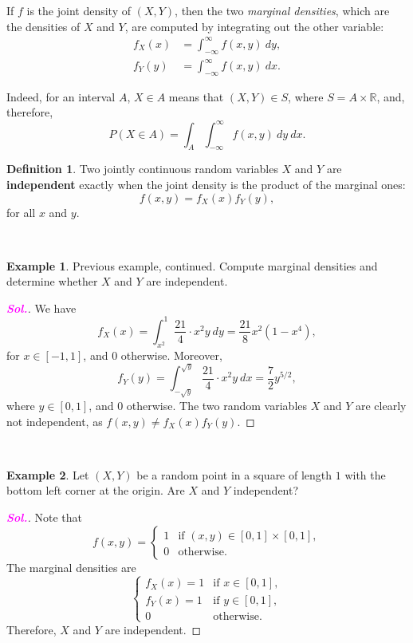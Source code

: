 \documentclass[12pt,a4paper]{article}
\theoremstyle{definition}
\newtheorem{example}{Example}[section]
\theoremstyle{definition}
\newtheorem*{definition}{Definition}
\theoremstyle{definition}
\theoremstyle{definition}
\theoremstyle{remark}
\theoremstyle{definition}
\newcommand{\sol}{\textcolor{magenta}{\bf \textit{Sol.}}\quad}
\begin{document}
\newpage
\begin{tcolorbox}[colback=white]
	If $f$ is the joint density of $(X,Y)$, then the two \textit{marginal densities}, which are the densities of $X$ and $Y$, are computed by integrating out the other variable: \begin{align*}
	f_X(x)&=\int_{-\infty}^\infty f(x,y)\ dy,\\
	f_Y(y)&=\int_{-\infty}^\infty f(x,y)\ dx.
	\end{align*}
\end{tcolorbox} Indeed, for an interval $A$, $X\in A$ means that $(X,Y)\in S$, where $S=A\times\mathbb{R}$, and, therefore, \[
P(X\in A)=\int_A\int_{-\infty}^\infty f(x,y)\ dy\ dx.
\]
\begin{tcolorbox}[colback=white]
	\begin{definition}	
	Two jointly continuous random variables $X$ and $Y$ are \textbf{independent} exactly when the joint density is the product of the marginal ones: \[
	f(x,y)=f_X(x)f_Y(y),
	\] for all $x$ and $y$.
	\end{definition}
\end{tcolorbox}
\
\begin{example}
	Previous example, continued. Compute marginal densities and determine whether $X$ and $Y$ are independent. \begin{proof}[\sol]
		We have \[
		f_X(x)=\int_{x^2}^1\frac{21}{4}\cdot x^2y\ dy=\frac{21}{8}x^2(1-x^4),
		\] for $x\in[-1,1]$, and $0$ otherwise. Moreover, \[
		f_Y(y)=\int_{-\sqrt{y}}^{\sqrt{y}}\frac{21}{4}\cdot x^2y\ dx=\frac{7}{2}y^{5/2},
		\] where $y\in[0,1]$, and $0$ otherwise. The two random variables $X$ and $Y$ are clearly not independent, as $f(x,y)\neq f_X(x)f_Y(y)$.
	\end{proof}
\end{example}
\
\begin{example}
	Let $(X,Y)$ be a random point in a square of length $1$ with the bottom left corner at the origin. Are $X$ and $Y$ independent?\begin{proof}[\sol]
		Note that \[
		f(x,y)=\begin{cases}
		1 &\text{if $(x,y)\in[0,1]\times[0,1]$},\\
		0 &\text{otherwise}.
		\end{cases}
		\] The marginal densities are \[
		\begin{cases}
		f_X(x)=1 &\text{if $x\in[0,1]$},\\
		f_Y(x)=1 &\text{if $y\in[0,1]$},\\
		0 &\text{otherwise}.
		\end{cases}
		\] Therefore, $X$ and $Y$ are independent.
	\end{proof}
\end{example}
\end{document}
